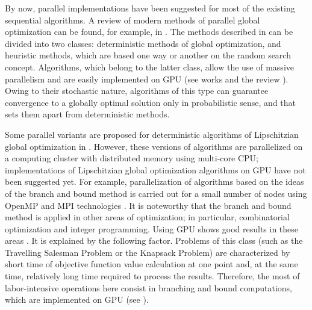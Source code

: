 \documentclass[smallcondensed]{svjour3}     %
\begin{document}
By now, parallel implementations have been suggested for most of the existing sequential algorithms. A review of modern methods of parallel global optimization can be found, for example, in \cite{RefApuzzo}. The methods described in \cite{RefApuzzo} can be divided into two classes: deterministic methods of global optimization, and heuristic methods, which are based one way or another on the random search concept. Algorithms, which belong to the latter class, allow the use of massive parallelism and are easily implemented on GPU (see works \cite{RefFerreiro,RefZhu,RefGarcia,RefMussi} and the review \cite{RefLangdon}). Owing to their stochastic nature, algorithms of this type can guarantee convergence to a globally optimal solution only in probabilistic sense, and that sets them apart from deterministic methods.

Some parallel variants are proposed for deterministic algorithms of Lipschitzian global optimization in \cite{RefGergel2005,RefEvtushenko,RefHe,RefPaulavicius}. However, these versions of algorithms are parallelized on a computing cluster with distributed memory using multi-core CPU; implementations of Lipschitzian global optimization algorithms on GPU have not been suggested yet. For example, parallelization of algorithms based on the ideas of the branch and bound method is carried out for a small number of nodes using OpenMP and MPI technologies \cite{RefPaulavicius}. It is noteworthy that the branch and bound method is applied in other areas of optimization; in particular, combinatorial optimization and integer programming. Using GPU shows good results in these areas \cite{RefBoukedjar,RefCarneiro}. It is explained by the following factor. Problems of this class (such as the Travelling Salesman Problem or the Knapsack Problem) are characterized by short time of objective function value calculation at one point and, at the same time, relatively long time required to process the results. Therefore, the most of labor-intensive operations here consist in branching and bound computations, which are implemented on GPU (see \cite{RefBoukedjar,RefCarneiro}).
\end{document}
